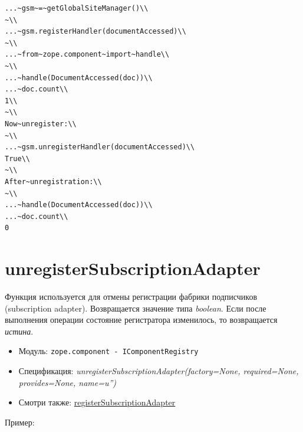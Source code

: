 \documentclass[a4paper,openany,twoside,draft]{book}
\providecommand*{\DUroletitlereference}[1]{\textsl{#1}}
\begin{document}
\begin{verbatim}
...~gsm~=~getGlobalSiteManager()\\
~\\
...~gsm.registerHandler(documentAccessed)\\
~\\
...~from~zope.component~import~handle\\
~\\
...~handle(DocumentAccessed(doc))\\
...~doc.count\\
1\\
~\\
Now~unregister:\\
~\\
...~gsm.unregisterHandler(documentAccessed)\\
True\\
~\\
After~unregistration:\\
~\\
...~handle(DocumentAccessed(doc))\\
...~doc.count\\
0
\end{verbatim}


\section*{unregisterSubscriptionAdapter%
  \label{unregistersubscriptionadapter}%
}

Функция используется для отмены регистрации фабрики подписчиков
(subscription adapter).  Возвращается значение типа \DUroletitlereference{boolean}. Если
после выполнения операции состояние регистратора изменилось, то
возвращается \DUroletitlereference{истина}.

\begin{itemize}

\item Модуль: \texttt{zope.component - IComponentRegistry}

\item Спецификация: \DUroletitlereference{unregisterSubscriptionAdapter(factory=None,
required=None, provides=None, name=u'')}

\item Смотри также: \hyperref[registersubscriptionadapter]{registerSubscriptionAdapter}

\end{itemize}

Пример:
\end{document}
